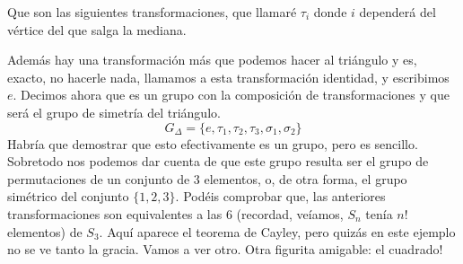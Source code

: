 \documentclass[12pt]{article}
\begin{document}
Que son las siguientes transformaciones, que llamaré $\tau_i$ donde $i$ dependerá del vértice del que salga la mediana. 
\begin{center}
\end{center} 
\begin{center}
\end{center} 
\begin{center}
\end{center} 
Además hay una transformación más que podemos hacer al triángulo y es, exacto, no hacerle nada, llamamos a esta transformación identidad, y escribimos $e$. Decimos ahora que es un grupo con la composición de transformaciones y que será el grupo de simetría del triángulo. 
$$G_{\Delta}=\{e,\tau_1,\tau_2,\tau_3,\sigma_1,\sigma_2\}$$
Habría que demostrar que esto efectivamente es un grupo, pero es sencillo. Sobretodo nos podemos dar cuenta de que este grupo resulta ser el grupo de permutaciones de un conjunto de $3$ elementos, o, de otra forma, el grupo simétrico del conjunto $\{1,2,3\}$. Podéis comprobar que, las anteriores transformaciones son equivalentes a las $6$ (recordad, veíamos, $S_n$ tenía $n!$ elementos) de $S_3$. Aquí aparece el teorema de Cayley, pero quizás en este ejemplo no se ve tanto la gracia. Vamos a ver otro. Otra figurita amigable: el cuadrado!
\begin{center}
\end{center} 
\end{document}

